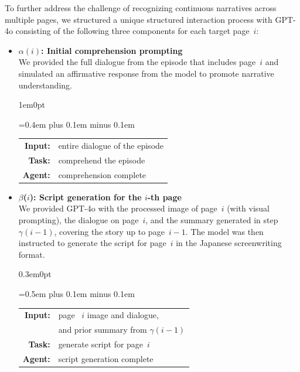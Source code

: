 To further address the challenge of recognizing continuous narratives across multiple pages, we structured a unique structured interaction process with GPT-4o consisting of the following three components for each target page~$i$:

\begin{itemize}
    \item \textbf{$\alpha(i)$: Initial comprehension prompting} \\
    We provided the full dialogue from the episode that includes page~$i$ and simulated an affirmative response from the model to promote narrative understanding.

    \vspace{0.5em}
    \begin{adjustwidth}{1em}{0pt}
      \setlength{\tabcolsep}{2pt}
      {\ttfamily\spaceskip=0.4em plus 0.1em minus 0.1em
      \begin{tabular}{@{}r l@{}}
      \textbf{Input:} & entire dialogue of the episode\\
      \textbf{Task:} & comprehend the episode \\
      \textbf{Agent:} & comprehension complete \\
      \end{tabular}
      }
  \end{adjustwidth}
  \vspace{0.5em}

    \item \textbf{$\beta$($i$): Script generation for the $i$-th page} \\
    We provided GPT-4o with the processed image of page~$i$ (with visual prompting), the dialogue on page~$i$, and the summary generated in step $\gamma(i{-}1)$, covering the story up to page~$i{-}1$. The model was then instructed to generate the script for page~$i$ in the Japanese screenwriting format.

    \vspace{0.5em}
    \begin{adjustwidth}{0.3em}{0pt}
      \setlength{\tabcolsep}{2pt}
      {\ttfamily\spaceskip=0.5em plus 0.1em minus 0.1em
      \begin{tabular}{@{}r l@{}}
      \textbf{Input:} & page 
  ~$i$ image and dialogue,\\
                      & and prior summary from $\gamma(i{-}1)$\\
      \textbf{Task:} & generate script for page~$i$  \\
      \textbf{Agent:} & script generation complete \\
      \end{tabular}
      }
  \end{adjustwidth}
  \vspace{0.5em} 


\end{itemize}
